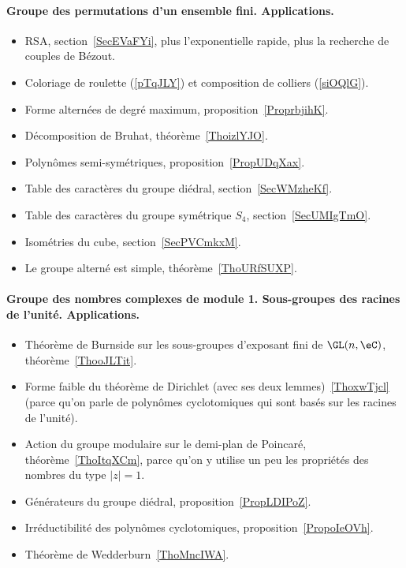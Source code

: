 \paragraph{Groupe des permutations d'un ensemble fini. Applications.}
\begin{itemize}
	\item RSA, section~\ref{SecEVaFYi}, plus l'exponentielle rapide, plus la recherche de couples de Bézout.
	\item Coloriage de roulette (\ref{pTqJLY}) et composition de colliers (\ref{siOQlG}).
	\item Forme alternées de degré maximum, proposition~\ref{ProprbjihK}.
	\item Décomposition de Bruhat, théorème~\ref{ThoizlYJO}.
	\item Polynômes semi-symétriques, proposition~\ref{PropUDqXax}.
	\item Table des caractères du groupe diédral, section~\ref{SecWMzheKf}.
	\item Table des caractères du groupe symétrique \( S_4\), section~\ref{SecUMIgTmO}.
	\item Isométries du cube, section~\ref{SecPVCmkxM}.
	\item Le groupe alterné est simple, théorème~\ref{ThoURfSUXP}.
\end{itemize}
\paragraph{Groupe des nombres complexes de module 1. Sous-groupes des racines de l'unité. Applications.}
\begin{itemize}
	\item Théorème de Burnside sur les sous-groupes d'exposant fini de \( \GL(n,\eC)\), théorème~\ref{ThooJLTit}.
	\item Forme faible du théorème de Dirichlet (avec ses deux lemmes)~\ref{ThoxwTjcl} (parce qu'on parle de polynômes cyclotomiques qui sont basés sur les racines de l'unité).
	\item Action du groupe modulaire sur le demi-plan de Poincaré, théorème~\ref{ThoItqXCm}, parce qu'on y utilise un peu les propriétés des nombres du type \( | z |=1\).
	\item Générateurs du groupe diédral, proposition~\ref{PropLDIPoZ}.
	\item Irréductibilité des polynômes cyclotomiques, proposition~\ref{PropoIeOVh}.
	\item Théorème de Wedderburn~\ref{ThoMncIWA}.
\end{itemize}

